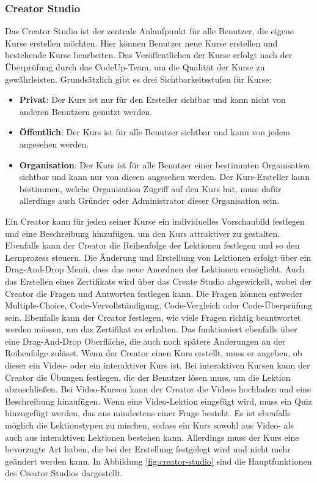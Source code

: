 \documentclass[main.tex]{subfiles}
\begin{document}
    \subsubsection{Creator Studio}
    Das Creator Studio ist der zentrale Anlaufpunkt für alle Benutzer, die eigene Kurse erstellen möchten.
    Hier können Benutzer neue Kurse erstellen und bestehende Kurse bearbeiten.
    Das Veröffentlichen der Kurse erfolgt nach der Überprüfung durch das CodeUp-Team, um die Qualität der Kurse zu gewährleisten.
    Grundsätzlich gibt es drei Sichtbarkeitsstufen für Kurse:
    \begin{itemize}
        \item \textbf{Privat}: Der Kurs ist nur für den Ersteller sichtbar und kann nicht von anderen Benutzern genutzt werden.
        \item \textbf{Öffentlich}: Der Kurs ist für alle Benutzer sichtbar und kann von jedem angesehen werden.
        \item \textbf{Organisation}: Der Kurs ist für alle Benutzer einer bestimmten Organisation sichtbar und kann nur von diesen angesehen werden.
        Der Kurs-Ersteller kann bestimmen, welche Organisation Zugriff auf den Kurs hat, muss dafür allerdings auch Gründer oder Administrator dieser Organisation sein.
    \end{itemize}
    Ein Creator kann für jeden seiner Kurse ein individuelles Vorschaubild festlegen und eine Beschreibung hinzufügen, um den Kurs attraktiver zu gestalten.
    Ebenfalls kann der Creator die Reihenfolge der Lektionen festlegen und so den Lernprozess steuern.
    Die Änderung und Erstellung von Lektionen erfolgt über ein Drag-And-Drop Menü, dass das neue Anordnen der Lektionen ermöglicht.
    Auch das Erstellen eines Zertifikats wird über das Create Studio abgewickelt, wobei der Creator die Fragen und Antworten festlegen kann.
    Die Fragen können entweder Multiple-Choice, Code-Vervollständigung, Code-Vergleich oder Code-Überprüfung sein.
    Ebenfalls kann der Creator festlegen, wie viele Fragen richtig beantwortet werden müssen, um das Zertifikat zu erhalten.
    Das funktioniert ebenfalls über eine Drag-And-Drop Oberfläche, die auch noch spätere Änderungen an der Reihenfolge zulässt.
    Wenn der Creator einen Kurs erstellt, muss er angeben, ob dieser ein Video- oder ein interaktiver Kurs ist.
    Bei interaktiven Kursen kann der Creator die Übungen festlegen, die der Benutzer lösen muss, um die Lektion abzuschließen.
    Bei Video-Kursen kann der Creator die Videos hochladen und eine Beschreibung hinzufügen.
    Wenn eine Video-Lektion eingefügt wird, muss ein Quiz hinzugefügt werden, das aus mindestens einer Frage besteht.
    Es ist ebenfalls möglich die Lektionstypen zu mischen, sodass ein Kurs sowohl aus Video- als auch aus interaktiven Lektionen bestehen kann.
    Allerdings muss der Kurs eine bevorzugte Art haben, die bei der Erstellung festgelegt wird und nicht mehr geändert werden kann.
    In Abbildung \ref{fig:creator-studio} sind die Hauptfunktionen des Creator Studios dargestellt.
\end{document}
